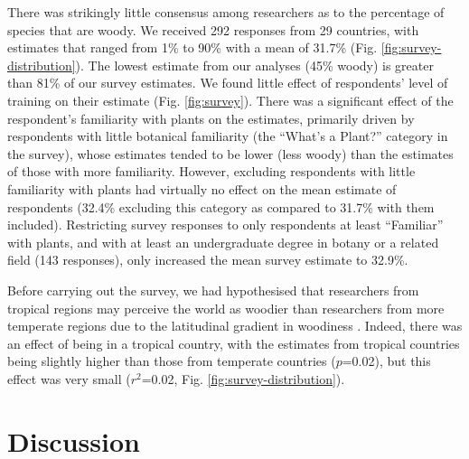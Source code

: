 \documentclass[a4paper,12pt]{article}
\begin{document}
There was strikingly little consensus among researchers as to the
percentage of species that are woody.  We received 292 responses from
29 countries, with estimates that ranged from 1\% to 90\% with a mean
of 31.7\% (Fig. \ref{fig:survey-distribution}).  The lowest
estimate from our analyses (45\% woody) is greater than 81\% of our survey estimates.
We found little effect of respondents' level of training on their
estimate (Fig. \ref{fig:survey}).  There was a significant effect of
the respondent's familiarity with plants on the estimates, primarily
driven by respondents with little botanical familiarity (the ``What's
a Plant?'' category in the survey), whose estimates tended to be lower (less woody)
than the estimates of those with more familiarity. However, excluding
respondents with little familiarity with plants had virtually no effect
on the mean estimate of respondents (32.4\% excluding this category as compared
to 31.7\% with them included).
Restricting survey responses to only respondents at least ``Familiar''
with plants, and with at least an undergraduate degree in botany or a
related field (143 responses), only increased the mean survey estimate
to 32.9\%.

Before carrying out the survey, we had hypothesised that researchers
from tropical regions may perceive the world as woodier than
researchers from more temperate regions due to the latitudinal
gradient in woodiness \citep{Molesheihgt}.
%
Indeed, there was an effect of being in a tropical country, with the
estimates from tropical countries being slightly higher than those
from temperate countries ($p$=0.02), but this effect was very small
($r^2$=0.02, Fig. \ref{fig:survey-distribution}).

\section{Discussion}
\end{document}
